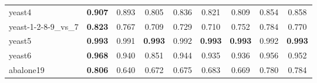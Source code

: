 \begin{table}[!htbp]
{\begin{tabular}{lcccccccc}
			yeast4 & \textbf{0.907} & 0.893 & 0.805 & 0.836 & 0.821 & 0.809 & 0.854 & 0.858 \\
			yeast-1-2-8-9\_vs\_7 & \textbf{0.823} & 0.767 & 0.709 & 0.729 & 0.710 & 0.752 & 0.784 & 0.770 \\
			yeast5 & \textbf{0.993} & 0.991 & \textbf{0.993} & 0.992 & \textbf{0.993} & \textbf{0.993} & 0.992 & \textbf{0.993} \\
			yeast6 & \textbf{0.968} & 0.940 & 0.851 & 0.944 & 0.935 & 0.936 & 0.956 & 0.952 \\
			abalone19 & \textbf{0.806} & 0.640 & 0.672 & 0.675 & 0.683 & 0.669 & 0.780 & 0.784 \\
			\bottomrule
		\end{tabular}%
		
	}
	\label{tab:AUCAllDatasets}%
\end{table}%


